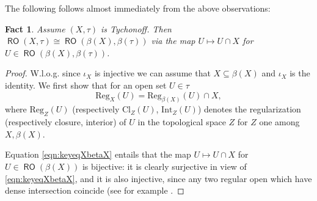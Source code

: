 \documentclass[11pt]{amsart}
\theoremstyle{plain}
\newtheorem{fact}[theorem]{Fact}
\theoremstyle{definition}
\theoremstyle{plain}
\theoremstyle{remark}
\DeclareMathOperator{\RO}{\mathsf{RO}}
\newcommand{\0}{\mathsf{0}}
\renewcommand{\1}{\mathsf{1}}
\renewcommand{\2}{\mathsf{2}}
\theoremstyle{definition}
\begin{document}
 The following follows almost immediately from the above observations:
\begin{fact}\label{fac:StCe-iso}
Assume $(X,\tau)$ is Tychonoff. Then $\RO(X,\tau)\cong\RO(\beta(X),\beta(\tau))$ via the map $U\mapsto U\cap X$ for $U\in \RO(\beta(X),\beta(\tau))$.
\end{fact}

\begin{proof}
W.l.o.g. since $\iota_X$ is injective we can assume that $X\subseteq\beta(X)$ and $\iota_X$ is the identity.
We first show that for an open set $U\in\tau$ 
\begin{equation}\label{eqn:keyeqXbetaX}
\mathrm{Reg}_X(U)=\mathrm{Reg}_{\beta(X)}(U)\cap X,
\end{equation} where
$\mathrm{Reg}_Z(U)$ (respectively $\mathrm{Cl}_Z(U)$, $\mathrm{Int}_Z(U)$) denotes the regularization (respectively closure, interior) of $U$ in the topological space $Z$ for $Z$ one among $X,\beta(X)$.

Equation \ref{eqn:keyeqXbetaX} entails that the map $U\mapsto U\cap X$ for $U\in\RO(\beta(X))$ is bijective: it is clearly surjective in view of \ref{eqn:keyeqXbetaX}, and it is also injective, since  any two regular open which have dense intersection coincide (see for example \cite[Fact 2.1.7]{viale-bookonforcing}.


\end{proof}
\end{document}
